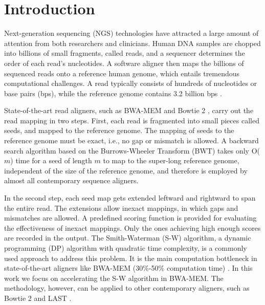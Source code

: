 \section{Introduction} 
\label{sec:introduction}

Next-generation sequencing (NGS) technologies have attracted a large amount of attention from both researchers and clinicians. 
Human DNA samples are chopped into billions of small fragments, called reads, and a sequencer determines the order of each read's nucleotides. 
A software aligner then maps the billions of sequenced reads onto a reference human genome, which entails tremendous computational challenges.
A read typically consists of hundreds of nucleotides or base pairs (bps), while the reference genome contains 3.2 billion bps \cite{Mardis2008}.

State-of-the-art read aligners, such as BWA-MEM \cite{BWA-MEM} and Bowtie 2 \cite{Bowtie2}, 
carry out the read mapping in two steps. 
First, each read is fragmented into small pieces called seeds, and mapped to the reference genome. 
The mapping of seeds to the reference genome must be exact, i.e., no gap or mismatch is allowed. 
A backward search algorithm based on the Burrows-Wheeler Transform (BWT) \cite{BWT} takes only O($m$) time for a seed of length $m$ to map to the super-long reference genome, independent of the size of the reference genome, and therefore is employed by almost all contemporary sequence aligners.

In the second step, each seed map gets extended leftward and rightward to span the entire read. 
The extensions allow inexact mappings, in which gaps and mismatches are allowed. A predefined scoring function is provided for evaluating the effectiveness of inexact mappings. Only the ones achieving high enough scores are recorded in the output. 
The Smith-Waterman (S-W) algorithm, a dynamic programming (DP) algorithm with quadratic time complexity, is a commonly used approach to address this problem. 
It is the main computation bottleneck in state-of-the-art aligners like BWA-MEM (30\%-50\% computation time) \cite{BWA-MEM}. 
In this work we focus on accelerating the S-W algorithm in BWA-MEM. The methodology, however, can be applied to other contemporary aligners, such as Bowtie 2 \cite{Bowtie2} and LAST \cite{LAST}. 

